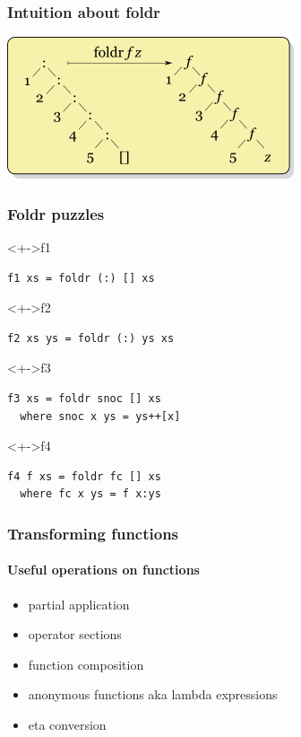 \documentclass{beamer}
\begin{document}
\begin{frame}
  \frametitle{Intuition about foldr}
  \begin{center}
    \includegraphics{Right-fold-transformation}
  \end{center}
\end{frame}
\begin{frame}[fragile]
  \frametitle{Foldr puzzles}
  \begin{block}<+->{f1}
\begin{verbatim}
f1 xs = foldr (:) [] xs
\end{verbatim}
  \end{block}
  \begin{block}<+->{f2}
\begin{verbatim}
f2 xs ys = foldr (:) ys xs
\end{verbatim}
  \end{block}
  \begin{block}<+->{f3}
\begin{verbatim}
f3 xs = foldr snoc [] xs
  where snoc x ys = ys++[x]
\end{verbatim}
  \end{block}
  \begin{block}<+->{f4}
\begin{verbatim}
f4 f xs = foldr fc [] xs
  where fc x ys = f x:ys
\end{verbatim}
  \end{block}
\end{frame}
\begin{frame}
  \frametitle{Transforming functions}
  \framesubtitle{Useful operations on functions}
  \begin{itemize}
  \item partial application
  \item operator sections
  \item function composition
  \item anonymous functions aka lambda expressions
  \item eta conversion
  \end{itemize}
\end{frame}
\end{document}
